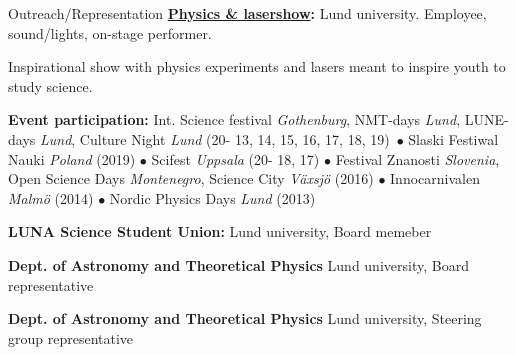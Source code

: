 \begin{rubric}{Outreach/Representation}
\entry*[2013 - current]%
\textbf{\href{https://www.facebook.com/Physicsandlasershow}{Physics \& lasershow}:} Lund university. Employee, sound/lights, on-stage performer. \par Inspirational show with physics experiments and lasers meant to inspire youth to study science. \par
\textbf{Event participation:} Int. Science festival \textit{Gothenburg}, NMT-days \textit{Lund}, LUNE-days \textit{Lund}, Culture Night \textit{Lund} (20- 13, 14, 15, 16, 17, 18, 19)\ $\bullet$ Slaski Festiwal Nauki \textit{Poland} (2019)  $\bullet$ Scifest \textit{Uppsala} (20- 18, 17) $\bullet$ Festival Znanosti \textit{Slovenia}, Open Science Days \textit{Montenegro}, Science City \textit{Växsjö} (2016) $\bullet$ Innocarnivalen \textit{Malmö} (2014) $\bullet$ Nordic Physics Days \textit{Lund} (2013)

\entry*[2013-2015]%
\textbf{LUNA Science Student Union:} Lund university, Board memeber \par

\entry*[2017-2018]%
\textbf{Dept. of Astronomy and Theoretical Physics} Lund university, Board representative \par

\entry*[2020-current]%
\textbf{Dept. of Astronomy and Theoretical Physics} Lund university, Steering group representative \par

\end{rubric}